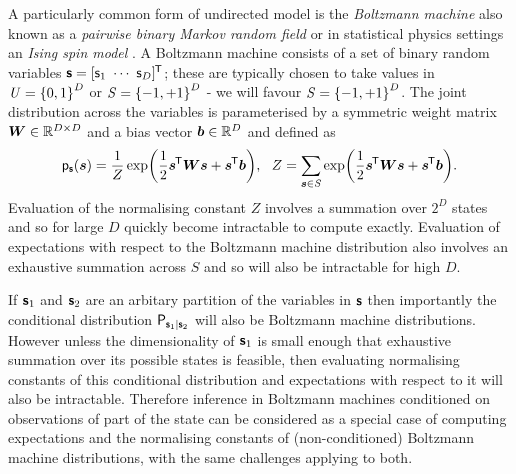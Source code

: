 A particularly common form of undirected model is the \emph{Boltzmann machine} \citep{ackley1985learning} also known as a \emph{pairwise binary Markov random field} \citep{kindermann1980markov} or in statistical physics settings an \emph{Ising spin model} \citep{ising1925beitrag}. A Boltzmann machine consists of a set of binary random variables $\boldsymbol{\mathsf{s}} = [\mathsf{s}_1 ~ \cdots ~ \mathsf{s}_D]^{\mkern-1.5mu\mathsf{T}}$; these are typically chosen to take values in $\set{U} = \fset{0,1}^D$ or $\set{S} = \fset{-1,+1}^D$ - we will favour $\set{S} = \fset{-1,+1}^D$. The joint distribution across the variables is parameterised by a symmetric weight matrix $\boldsymbol{W} \in \mathbb{R}^{D\times D}$ and a bias vector $\boldsymbol{b} \in \mathbb{R}^D$ and defined as
\begin{equation}\label{eq:boltzmann-machine-distribution}
  \pden{\rvct{s}}(\vct{s}) =
  \frac{1}{Z} \exp\lpa \frac{1}{2}\vct{s}\tr\mtx{W}\vct{s} + \vct{s}\tr\vct{b}\rpa,
  ~~
  Z = \sum_{\vct{s} \in \set{S}} \exp\lpa \frac{1}{2}\vct{s}\tr\mtx{W}\vct{s} + \vct{s}\tr\vct{b}\rpa.
\end{equation}
Evaluation of the normalising constant $Z$ involves a summation over $2^D$ states and so for large $D$ quickly become intractable to compute exactly. Evaluation of expectations with respect to the Boltzmann machine distribution also involves an exhaustive summation across $S$ and so will also be intractable for high $D$. %

If $\boldsymbol{\mathsf{s}}_1$ and $\boldsymbol{\mathsf{s}}_2$ are an arbitary partition of the variables in $\boldsymbol{\mathsf{s}}$ then importantly the conditional distribution $\mathsf{P}_{\boldsymbol{\mathsf{s}}_1|\boldsymbol{\mathsf{s}}_2}$ will also be Boltzmann machine distributions. However unless the dimensionality of $\boldsymbol{\mathsf{s}}_1$ is small enough that exhaustive summation over its possible states is feasible, then evaluating normalising constants of this conditional distribution and expectations with respect to it will also be intractable. Therefore inference in Boltzmann machines conditioned on observations of part of the state can be considered as a special case of computing expectations and the normalising constants of (non-conditioned) Boltzmann machine distributions, with the same challenges applying to both.


